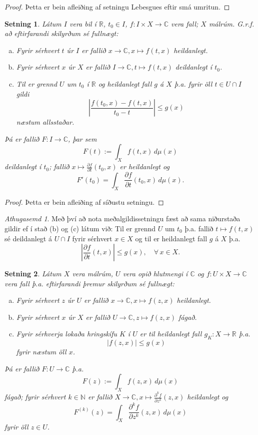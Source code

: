 \documentclass[a4paper,icelandic,11pt]{book}
\theoremstyle{plain}      \newtheorem{setn}{Setning}[chapter]
\theoremstyle{definition} \newtheorem{skilgr}[setn]{Skilgreining}
\theoremstyle{remark}     \newtheorem*{ath}{Athugasemd}
\newcommand{\R}{\mathbb R}
\newcommand{\C}{\mathbb C}
\newcommand{\N}{\mathbb N}
\begin{document}
\begin{proof}
  Þetta er bein afleiðing af setningu Lebesgues eftir smá umritun.
\end{proof}
\begin{setn}
  Látum $I$ vera bil í $\R$, $t_{0}\in I$, $f:I\times X\to\C$ vera
  fall; $X$ málrúm. G.r.f. að eftirfarandi skilyrðum sé fullnægt:
  \begin{enumerate}[(a)]
  \item Fyrir sérhvert $t$ úr $I$ er fallið $x\to\C,x\mapsto f(t,x)$
    heildanlegt.
  \item Fyrir sérhvert $x$ úr $X$ er fallið $I\to\C,t\mapsto f(t,x)$
    deildanlegt í $t_{0}$.
  \item Til er grennd $U$ um $t_{0}$ í $\R$ og heildanlegt fall $g$ á
    $X$ þ.a. fyrir öll $t\in U\cap I$ gildi
    \[
    \left| \frac{f(t_{0},x) - f(t,x)}{t_{0} - t} \right|
    \le g(x)
    \]
    næstum allsstaðar.
  \end{enumerate}
  Þá er fallið $F: I\to\C$, þar sem
  \[
  F(t) := \int_{X} f(t,x)\,d\mu(x)
  \]
  deildanlegt í $t_{0}$; fallið
  $x\mapsto\frac{\partial{f}}{\partial{t}}(t_{0},x)$ er heildanlegt og
  \[
  F'(t_{0})
  = \int_{X}\frac{\partial{f}}{\partial{t}}(t_{0},x)\,d\mu(x).
  \]
\end{setn}
\begin{proof}
  Þetta er bein afleiðing af síðustu setningu.
\end{proof}
\begin{ath}
  Með því að nota meðalgildissetningu fæst að sama niðurstaða gildir
  ef í stað (b) og (c) látum við: Til er grennd $U$ um $t_{0}$
  þ.a. fallið $t\mapsto f(t,x)$ sé deildanlegt á $U\cap I$ fyrir
  sérhvert $x\in X$ og til er heildanlegt fall $g$ á $X$ þ.a.
  \[
  \left|
    \frac{\partial{f}}{\partial{t}}(t,x)
  \right|
  \le g(x),
  \quad \forall\,x\in X.
  \]
\end{ath}
\begin{setn}
  Látum $X$ vera málrúm, $U$ vera opið hlutmengi í $\C$ og
  $f:U\times{X}\to\C$ vera fall þ.a. eftirfarandi þremur skilyrðum sé
  fullnægt:
  \begin{enumerate}[(a)]
  \item Fyrir sérhvert $z$ úr $U$ er fallið $x\to\C,x\mapsto f(z,x)$
    heildanlegt.
  \item Fyrir sérhvert $x$ úr $X$ er fallið $U\to\C,z\mapsto f(z,x)$
    fágað.
  \item Fyrir sérhverja lokaða hringskífu $K$ í $U$ er til heildanlegt
    fall $g_{K}:X\to\R$ þ.a.
    \[
    |f(z,x)| \le g(x)
    \]
    fyrir næstum öll $x$.
  \end{enumerate}
  Þá er fallið $F:U\to\C$ þ.a.
  \[
  F(z) := \int_{X} f(z,x)\,d\mu(x)
  \]
  fágað; fyrir sérhvert $k\in\N$ er fallið
  $X\to\C,x\mapsto\frac{\partial^{k}{f}}{\partial{z}^{k}}(z,x)$
  heildanlegt og
  \[
  F^{(k)}(z)
  = \int_{X}\frac{\partial^{k}{f}}{\partial{z}^{k}}(z,x)\,d\mu(x)
  \]
  fyrir öll $z\in U$.
\end{setn}
\end{document}

